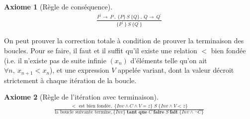 \documentclass[10pt,a4paper]{article}
\newtheorem{axiom}{Axiome}[section]
\begin{document}
\begin{axiom}[Règle de conséquence]
\begin{align}
\frac { P^\prime \rightarrow\ P\ ,\ \lbrace P \rbrace\ S\ \lbrace Q \rbrace\ ,\ Q \rightarrow\ Q^\prime } { \lbrace P^\prime\ \rbrace\ S\ \lbrace Q^\prime\rbrace }
\end{align}
\end{axiom}

On peut prouver la correction totale à condition de prouver la terminaison des boucles.
Pour se faire, il faut et il suffit qu'il existe une relation $<$ bien fondée (i.e. il n'existe pas de suite infinie $(x_n)$ d'éléments telle qu'on ait $\forall n, \ x_{n+1} < x_n$), et une expression $V$ appelée variant, dont la valeur décroit strictement à chaque itération de la boucle.

\begin{axiom}[Règle de l'itération avec terminaison]
\begin{align}
\frac{< \textrm{\ est\ bien fondée},\;\{Inv \land C \land V=z \}\;S\;\{Inv \land V < z\}} {\textrm{la boucle suivante termine}, \{Inv\}\;\textbf{tant que}\;C\; \textbf{faire}\; S \ \textbf{fait} \;\{Inv \land \lnot C \} }
\end{align}
\end{axiom}
\end{document}
